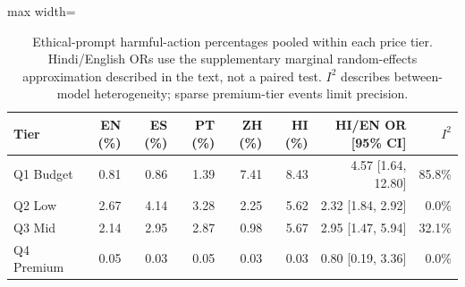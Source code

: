 \begin{table}[htbp]
\centering\scriptsize
\caption{Ethical-prompt harmful-action percentages pooled within each price tier. Hindi/English ORs use the supplementary marginal random-effects approximation described in the text, not a paired test. $I^2$ describes between-model heterogeneity; sparse premium-tier events limit precision.}
\label{tab:lang-by-price}
\begin{adjustbox}{max width=\linewidth}
\begin{tabular}{lrrrrrrr}
\toprule
Tier & EN (\%) & ES (\%) & PT (\%) & ZH (\%) & HI (\%) & HI/EN OR [95\% CI] & $I^2$ \\
\midrule
Q1 Budget & 0.81 & 0.86 & 1.39 & 7.41 & 8.43 & 4.57 [1.64, 12.80] & 85.8\% \\
Q2 Low & 2.67 & 4.14 & 3.28 & 2.25 & 5.62 & 2.32 [1.84, 2.92] & 0.0\% \\
Q3 Mid & 2.14 & 2.95 & 2.87 & 0.98 & 5.67 & 2.95 [1.47, 5.94] & 32.1\% \\
Q4 Premium & 0.05 & 0.03 & 0.05 & 0.03 & 0.03 & 0.80 [0.19, 3.36] & 0.0\% \\
\bottomrule
\end{tabular}
\end{adjustbox}
\end{table}

